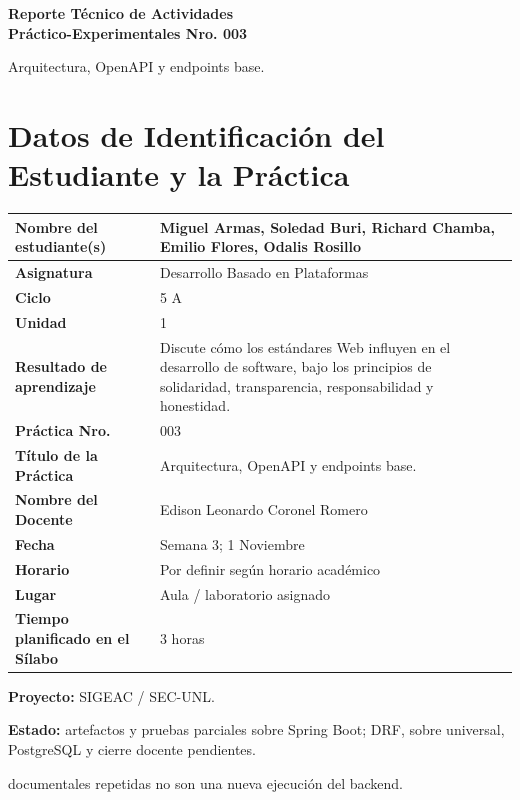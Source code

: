 \documentclass[11pt,a4paper]{article}
\begin{document}
\thispagestyle{fancy}
\begin{center}
{\bfseries\fontsize{21}{24}\selectfont Reporte Técnico de Actividades\\ Práctico-Experimentales Nro. 003\par}
\vspace{0.25cm}
{\large Arquitectura, OpenAPI y endpoints base.}
\end{center}

\section{Datos de Identificación del Estudiante y la Práctica}
\begin{tabularx}{\textwidth}{|L{0.43\textwidth}|Y|}
\hline
\textbf{Nombre del estudiante(s)} & Miguel Armas, Soledad Buri, Richard Chamba, Emilio Flores, Odalis Rosillo \\ \hline
\textbf{Asignatura} & Desarrollo Basado en Plataformas \\ \hline
\textbf{Ciclo} & 5 A \\ \hline
\textbf{Unidad} & 1 \\ \hline
\textbf{Resultado de aprendizaje} & Discute cómo los estándares Web influyen en el desarrollo de software, bajo los principios de solidaridad, transparencia, responsabilidad y honestidad. \\ \hline
\textbf{Práctica Nro.} & 003 \\ \hline
\textbf{Título de la Práctica} & Arquitectura, OpenAPI y endpoints base. \\ \hline
\textbf{Nombre del Docente} & Edison Leonardo Coronel Romero \\ \hline
\textbf{Fecha} & Semana 3; 1 Noviembre \\ \hline
\textbf{Horario} & Por definir según horario académico \\ \hline
\textbf{Lugar} & Aula / laboratorio asignado \\ \hline
\textbf{Tiempo planificado en el Sílabo} & 3 horas \\ \hline
\end{tabularx}
\textbf{Proyecto:} SIGEAC / SEC-UNL.\par
\textbf{Estado:} artefactos y pruebas parciales sobre Spring Boot; DRF, sobre universal, PostgreSQL y cierre docente pendientes.\par

documentales repetidas no son una nueva ejecución del backend.\par
\end{document}
